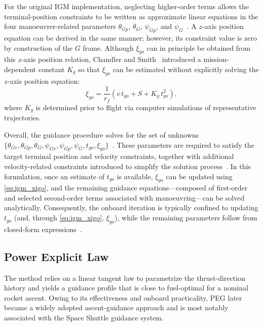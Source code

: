 For the original IGM implementation, neglecting higher-order terms allows the terminal-position constraints to be written as approximate linear equations in the four manoeuvrer-related parameters
$\theta_{Gp}$, $\dot{\theta}_G$, $\psi_{Gp}$, and $\dot{\psi}_G$~\cite{SONG2015463}.
A $z$-axis position equation can be derived in the same manner; however, its constraint value is zero by construction of the $G$ frame. Although $\xi_{go}$ can in principle be obtained from this $z$-axis position relation, Chandler and Smith~\cite{ChandlerSmith1967IterativeGuidanceMode} introduced a mission-dependent constant $K_g$ so that $\xi_{go}$ can be estimated without explicitly solving the $z$-axis position equation:
\begin{equation}
\xi_{go}=\frac{1}{r_f}\left(v\,t_{go}+S+K_g\,t_{go}^2\right),
\label{eq:igm_xigo}
\end{equation}
where $K_g$ is determined prior to flight via computer simulations of representative trajectories.

Overall, the guidance procedure solves for the set of unknowns
$\{\theta_{Gv},\theta_{Gp},\dot{\theta}_G,\psi_{Gv},\psi_{Gp},\dot{\psi}_G,t_{go},\xi_{go}\}$~\cite{SONG2015463}.
These parameters are required to satisfy the target terminal position and velocity constraints, together with additional velocity-related constraints introduced to simplify the solution process~\cite{ChandlerSmith1967IterativeGuidanceMode}. In this formulation, once an estimate of $t_{go}$ is available, $\xi_{go}$ can be updated using \eqref{eq:igm_xigo}, and the remaining guidance equations—composed of first-order and selected second-order terms associated with manoeuvring—can be solved analytically. Consequently, the onboard iteration is typically confined to updating $t_{go}$ (and, through \eqref{eq:igm_xigo}, $\xi_{go}$), while the remaining parameters follow from closed-form expressions~\cite{SONG2015463}.



\subsection{Power Explicit Law}

The method relies on a linear tangent law to parametrize the thrust-direction history and yields a guidance profile that is close to fuel-optimal for a nominal rocket ascent. Owing to its effectiveness and onboard practicality, PEG later became a widely adopted ascent-guidance approach and is most notably associated with the Space Shuttle guidance system.

